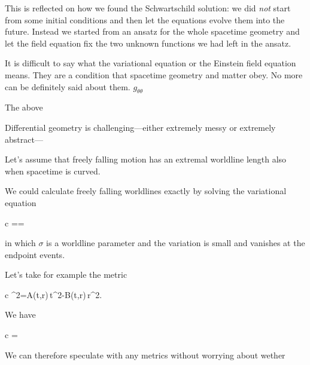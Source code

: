 \documentclass[11pt,oneside%
]{memoir}
\newenvironment{eqna}{\begin{IEEEeqnarray*}{c}}{\end{IEEEeqnarray*}\ignorespacesafterend}
\newcommand{\der}[2]{\frac{\dd#1}{\dd#2}}
\newcommand{\dd}{\mathrm{d}}
\begin{document}
This is reflected on how we found the Schwartschild solution: we did \emph{not} start from some initial conditions and then let the equations evolve them into the future. Instead we started from an ansatz for the whole spacetime geometry and let the field equation fix the two unknown functions we had left in the ansatz.

It is difficult to say what the variational equation or the Einstein field equation means. They are a condition that spacetime geometry and matter obey. No more can be definitely said about them.
\(g_{\theta\theta}\)


The above


Differential geometry is challenging---either extremely messy or extremely abstract---







Let's assume that freely falling motion has an extremal worldline length also when spacetime is curved. 

We could calculate freely falling worldlines exactly by solving the variational equation
\begin{eqna}
\delta\tau=\delta\int\dd\tau=\int\delta\,\der{\tau}{\sigma}\,\dd{}
\end{eqna}
in which \(\sigma\) is a worldline parameter and the variation is small and vanishes at the endpoint events.

Let's take for example the metric
\begin{eqna}
\dd\tau^2=A(t,r)\,\dd t^2-B(t,r)\,\dd r^2.
\end{eqna}
We have
\begin{eqna}
\delta\tau=\int\delta\dd\tau
\end{eqna}

We can therefore speculate with any metrics without worrying about wether 
\end{document}

